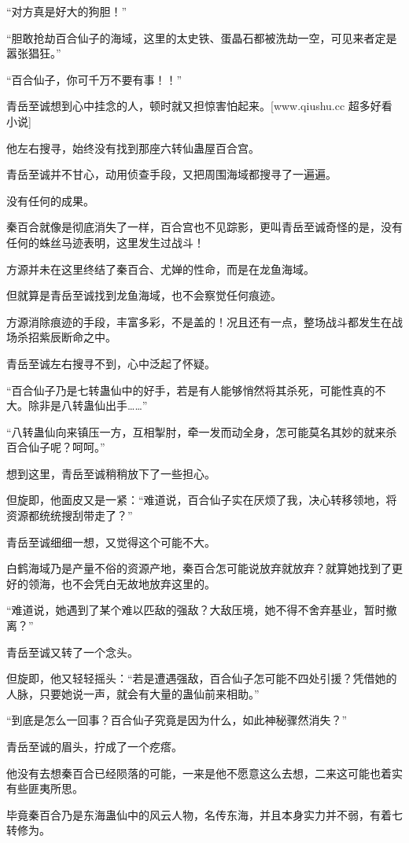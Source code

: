 \begin{this_body}
“对方真是好大的狗胆！”

“胆敢抢劫百合仙子的海域，这里的太史铁、蛋晶石都被洗劫一空，可见来者定是嚣张猖狂。”

“百合仙子，你可千万不要有事！！”

青岳至诚想到心中挂念的人，顿时就又担惊害怕起来。[www.qiushu.cc 超多好看小说]

他左右搜寻，始终没有找到那座六转仙蛊屋百合宫。

青岳至诚并不甘心，动用侦查手段，又把周围海域都搜寻了一遍遍。

没有任何的成果。

秦百合就像是彻底消失了一样，百合宫也不见踪影，更叫青岳至诚奇怪的是，没有任何的蛛丝马迹表明，这里发生过战斗！

方源并未在这里终结了秦百合、尤婵的性命，而是在龙鱼海域。

但就算是青岳至诚找到龙鱼海域，也不会察觉任何痕迹。

方源消除痕迹的手段，丰富多彩，不是盖的！况且还有一点，整场战斗都发生在战场杀招紫辰断命之中。

青岳至诚左右搜寻不到，心中泛起了怀疑。

“百合仙子乃是七转蛊仙中的好手，若是有人能够悄然将其杀死，可能性真的不大。除非是八转蛊仙出手……”

“八转蛊仙向来镇压一方，互相掣肘，牵一发而动全身，怎可能莫名其妙的就来杀百合仙子呢？呵呵。”

想到这里，青岳至诚稍稍放下了一些担心。

但旋即，他面皮又是一紧：“难道说，百合仙子实在厌烦了我，决心转移领地，将资源都统统搜刮带走了？”

青岳至诚细细一想，又觉得这个可能不大。

白鹤海域乃是产量不俗的资源产地，秦百合怎可能说放弃就放弃？就算她找到了更好的领海，也不会凭白无故地放弃这里的。

“难道说，她遇到了某个难以匹敌的强敌？大敌压境，她不得不舍弃基业，暂时撤离？”

青岳至诚又转了一个念头。

但旋即，他又轻轻摇头：“若是遭遇强敌，百合仙子怎可能不四处引援？凭借她的人脉，只要她说一声，就会有大量的蛊仙前来相助。”

“到底是怎么一回事？百合仙子究竟是因为什么，如此神秘骤然消失？”

青岳至诚的眉头，拧成了一个疙瘩。

他没有去想秦百合已经陨落的可能，一来是他不愿意这么去想，二来这可能也着实有些匪夷所思。

毕竟秦百合乃是东海蛊仙中的风云人物，名传东海，并且本身实力并不弱，有着七转修为。


\end{this_body}
